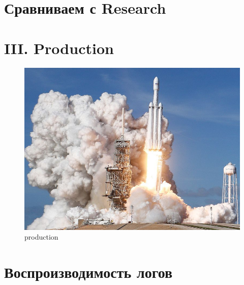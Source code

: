 \documentclass[11pt]{article}
\makeatletter
\def\maxwidth{\ifdim\Gin@nat@width>\linewidth\linewidth
    \else\Gin@nat@width\fi}
\let\Oldincludegraphics\includegraphics
\renewcommand{\includegraphics}[1]{\Oldincludegraphics[width=.8\maxwidth]{#1}}
\makeatother
\begin{document}
    \hypertarget{ux441ux440ux430ux432ux43dux438ux432ux430ux435ux43c-ux441-research}{%
\section{Сравниваем с
Research}\label{ux441ux440ux430ux432ux43dux438ux432ux430ux435ux43c-ux441-research}}

    \hypertarget{iii.-production}{%
\section{III. Production}\label{iii.-production}}

\begin{figure}
\centering
\includegraphics{images/production.jpg}
\caption{production}
\end{figure}

    \hypertarget{ux432ux43eux441ux43fux440ux43eux438ux437ux432ux43eux434ux438ux43cux43eux441ux442ux44c-ux43bux43eux433ux43eux432}{%
\section{Воспроизводимость
логов}\label{ux432ux43eux441ux43fux440ux43eux438ux437ux432ux43eux434ux438ux43cux43eux441ux442ux44c-ux43bux43eux433ux43eux432}}
\end{document}
